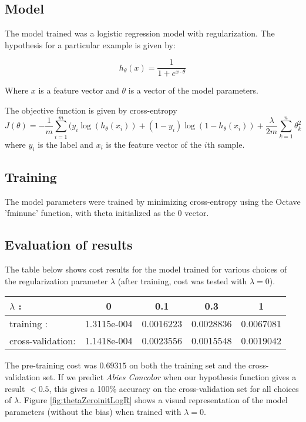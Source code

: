 \documentclass[12pt]{article}
\DeclareMathOperator{\Log}{log}
\newcommand*{\octfont}{\fontfamily{cmvtt}\selectfont}
\begin{document}
\subsection{Model} The model trained was a logistic regression model with regularization. The hypothesis for a particular example is given by:

\[
h_\theta(x) = \frac{1}{1+e^{x \cdot \theta}}
\]

Where $x$ is a feature vector and $\theta$ is a vector of the  model parameters.

The objective function is given by cross-entropy
\[
 J(\theta) = -\frac{1}{m}\sum_{i = 1}^m (y_i\Log(h_\theta(x_i))+(1-y_i)\Log(1-h_\theta(x_i)) + \frac{\lambda}{2m} \sum_{k=1}^n \theta_k^2
\]
where $y_i$ is the label and $x_i$ is the feature vector of the $i$th sample.

\subsection{Training} The model parameters were trained by minimizing cross-entropy using the Octave '{\octfont fminunc}' function, with theta initialized as the $0$ vector.

\subsection{Evaluation of results} The table below shows cost results for the model trained for various choices of the regularization parameter $\lambda$ (after training, cost was tested with $\lambda = 0$).

\begin{center}
\begin{tabular}{|l|c|c|c|c|}
 \hline
 $\lambda$ : & 0 & 0.1 & 0.3 & 1\\
 \hline
 training : & 1.3115e-004 & 0.0016223 & 0.0028836 & 0.0067081\\
 cross-validation: & 1.1418e-004 & 0.0023556 & 0.0015548 & 0.0019042 \\
 \hline
\end{tabular}
\end{center}

The pre-training cost was $0.69315$ on both the training set and the cross-validation set. If we predict \textit{Abies Concolor} when our hypothesis function gives a result $<0.5$, this gives a 100\% accuracy on the cross-validation set for all choices of $\lambda$. Figure \ref{fig:thetaZeroinitLogR} shows a visual representation of the model parameters (without the bias) when trained with $\lambda = 0$. 
\end{document}
